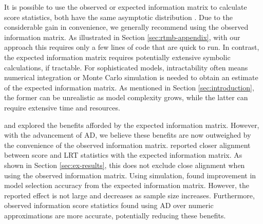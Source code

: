 \documentclass{article}
\begin{document}

It is possible to use the observed or expected information matrix to
calculate score statistics, both have the same asymptotic
distribution \parencite{catchpoleMorgan1996}. Due to the considerable
gain in convenience, we generally recommend using the observed
information matrix. As illustrated in Section \ref{sec:rtmb-appendix},
with our approach this requires only a few lines of code that are
quick to run. In contrast, the expected information matrix requires
potentially extensive symbolic calculations, if tractable. For
sophisticated models, intractability often means numerical integration or
Monte Carlo simulation is needed to obtain an estimate of the expected
information matrix. As mentioned in Section \ref{sec:introduction}, the former
can be unrealistic as model complexity grows, while the latter can
require extensive time and resources.

\textcite{catchpoleMorgan1996} and
\textcite{mccreaMorgan2011} explored the benefits afforded by the
expected information matrix. However, with the advancement of AD, we
believe these benefits are now outweighed by the convenience of the observed
information matrix. \textcite{catchpoleMorgan1996} reported closer  
alignment between score and LRT statistics with the expected information
matrix. As shown in Section \ref{sec:ex-results}, this does not
exclude close alignment when using the observed information  
matrix. Using simulation, \textcite{mccreaMorgan2011} found improvement in 
model selection accuracy from the expected information
matrix. However, the reported effect is not large and decreases as sample size
increases. Furthermore, observed information score statistics found
using AD over numeric approximations are more accurate, potentially
reducing these benefits.  

 
\end{document}
